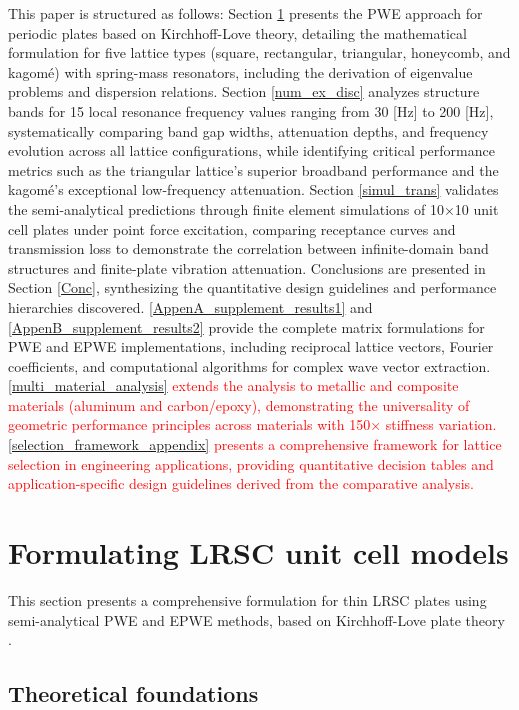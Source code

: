 \documentclass[review,numbers,sort&compress]{elsarticle}
\begin{document}
This paper is structured as follows: Section \ref{formu_mat} presents the PWE approach for periodic plates based on Kirchhoff-Love theory, detailing the mathematical formulation for five lattice types (square, rectangular, triangular, honeycomb, and kagomé) with spring-mass resonators, including the derivation of eigenvalue problems and dispersion relations. Section \ref{num_ex_disc} analyzes structure bands for 15 local resonance frequency values ranging from 30 [Hz] to 200 [Hz], systematically comparing band gap widths, attenuation depths, and frequency evolution across all lattice configurations, while identifying critical performance metrics such as the triangular lattice's superior broadband performance and the kagomé's exceptional low-frequency attenuation. Section \ref{simul_trans} validates the semi-analytical predictions through finite element simulations of 10×10 unit cell plates under point force excitation, comparing receptance curves and transmission loss to demonstrate the correlation between infinite-domain band structures and finite-plate vibration attenuation. Conclusions are presented in Section \ref{Conc}, synthesizing the quantitative design guidelines and performance hierarchies discovered. \ref{AppenA_supplement_results1} and \ref{AppenB_supplement_results2} provide the complete matrix formulations for PWE and EPWE implementations, including reciprocal lattice vectors, Fourier coefficients, and computational algorithms for complex wave vector extraction. \textcolor{red}{\ref{multi_material_analysis} extends the analysis to metallic and composite materials (aluminum and carbon/epoxy), demonstrating the universality of geometric performance principles across materials with 150× stiffness variation.} \textcolor{red}{\ref{selection_framework_appendix} presents a comprehensive framework for lattice selection in engineering applications, providing quantitative decision tables and application-specific design guidelines derived from the comparative analysis.}

\section{Formulating LRSC unit cell models}\label{formu_mat}

This section presents a comprehensive formulation for thin LRSC plates using semi-analytical PWE and EPWE methods, based on Kirchhoff-Love plate theory \cite{Love1888}. 

\subsection{Theoretical foundations}\label{theoretical_foundations}
\end{document}
